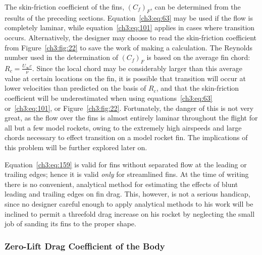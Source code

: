The skin-friction coefficient of the fins, $(C_f)_F$, can be determined from
the results of the preceding sections. Equation~\eqref{ch3:eq:63} may be used
if the flow is completely laminar, while equation~\eqref{ch3:eq:101} applies in
cases where transition occurs. Alternatively, the designer may choose to read
the skin-friction coefficient from Figure~\ref{ch3:fig:22} to save the work of
making a calculation. The Reynolds number used in the determination of
$(C_f)_F$ is based on the average fin chord: $R_c = \frac{U_\infty c}{\nu}$.
Since the local chord may be considerably larger than this average value at
certain locations on the fin, it is possible that transition will occur at
lower velocities than predicted on the basis of $R_c$, and that the
skin-friction coefficient will be underestimated when using
equations~\eqref{ch3:eq:63} or~\eqref{ch3:eq:101}, or Figure~\ref{ch3:fig:22}.
Fortunately, the danger of this is not very great, as the flow over the fins is
almost entirely laminar throughout the flight for all but a few model rockets,
owing to the extremely high airspeeds and large chords necessary to effect
transition on a model rocket fin. The implications of this problem will be
further explored later on.

Equation~\eqref{ch3:eq:159} is valid for fins without separated flow at the
leading or trailing edges; hence it is valid \emph{only} for streamlined fins.
At the time of writing there is no convenient, analytical method for
estimating the effects of blunt leading and trailing edges on fin drag. This,
however, is not a serious handicap, since no designer careful enough to apply
analytical methods to his work will be inclined to permit a threefold drag
increase on his rocket by neglecting the small job of sanding its fins to the
proper shape.

\subsubsection{Zero-Lift Drag Coefficient of the Body}\label{ch3:sec:6.1.2}


